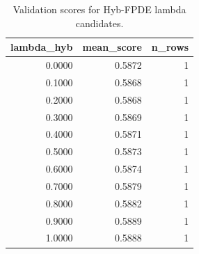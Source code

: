 \begin{table}[t]
\caption{Validation scores for Hyb-FPDE lambda candidates.}
\label{tab:lambda_distribution_computed}
\centering
\begin{tabular}{rrr}
\toprule
lambda\_hyb & mean\_score & n\_rows \\
\midrule
0.0000 & 0.5872 & 1 \\
0.1000 & 0.5868 & 1 \\
0.2000 & 0.5868 & 1 \\
0.3000 & 0.5869 & 1 \\
0.4000 & 0.5871 & 1 \\
0.5000 & 0.5873 & 1 \\
0.6000 & 0.5874 & 1 \\
0.7000 & 0.5879 & 1 \\
0.8000 & 0.5882 & 1 \\
0.9000 & 0.5889 & 1 \\
1.0000 & 0.5888 & 1 \\
\bottomrule
\end{tabular}

\end{table}
